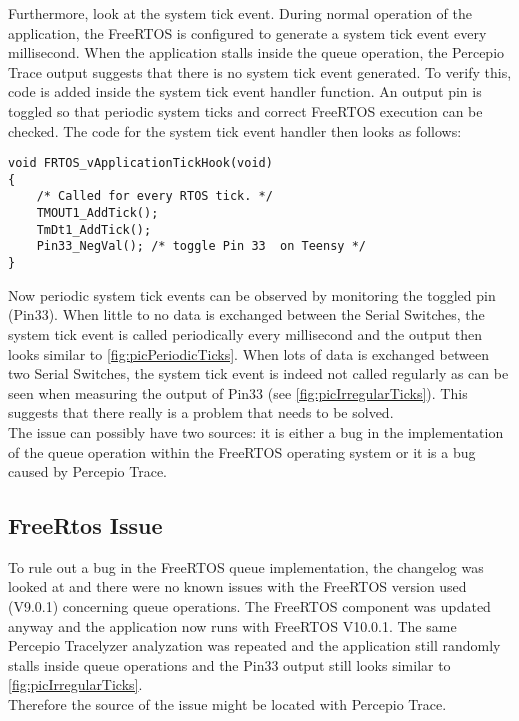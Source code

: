 Furthermore, look at the system tick event. During normal operation of the application, the FreeRTOS is configured to generate a system tick event every millisecond. When the application stalls inside the queue operation, the Percepio Trace output suggests that there is no system tick event generated. To verify this, code is added inside the system tick event handler function. An output pin is toggled so that periodic system ticks and correct FreeRTOS execution can be checked. The code for the system tick event handler then looks as follows:
\begin{lstlisting}
void FRTOS_vApplicationTickHook(void)
{
    /* Called for every RTOS tick. */
    TMOUT1_AddTick();
    TmDt1_AddTick();
    Pin33_NegVal(); /* toggle Pin 33  on Teensy */
}
\end{lstlisting}
Now periodic system tick events can be observed by monitoring the toggled pin (Pin33). When little to no data is exchanged between the Serial Switches, the system tick event is called periodically every millisecond and the output then looks similar to \autoref{fig:picPeriodicTicks}. When lots of data is exchanged between two Serial Switches, the system tick event is indeed not called regularly as can be seen when measuring the output of Pin33 (see \autoref{fig:picIrregularTicks}). This suggests that there really is a problem that needs to be solved.\\
%
%
The issue can possibly have two sources: it is either a bug in the implementation of the queue operation within the FreeRTOS operating system or it is a bug caused by Percepio Trace.
%
\subsection{FreeRtos Issue}
To rule out a bug in the FreeRTOS queue implementation, the changelog was looked at and there were no known issues with the FreeRTOS version used (V9.0.1) concerning queue operations. The FreeRTOS component was updated anyway and the application now runs with FreeRTOS V10.0.1. The same Percepio Tracelyzer analyzation was repeated and the application still randomly stalls inside queue operations and the Pin33 output still looks similar to \autoref{fig:picIrregularTicks}.\\
Therefore the source of the issue might be located with Percepio Trace.
%
